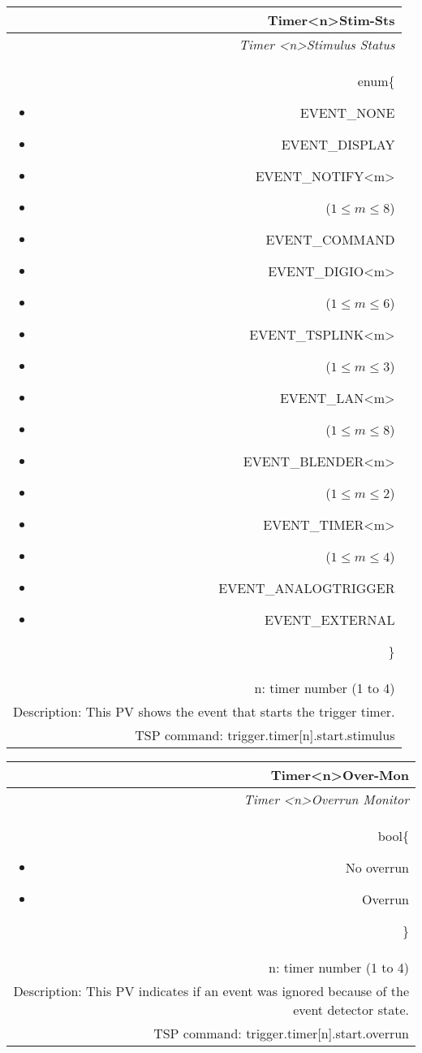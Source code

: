 \documentclass[openany]{article}
\begin{document}
		\begin{tabular}{N}
			\hline
			\bfseries Timer{\textless n\textgreater}Stim-Sts\label{pv:timerstim-sts} \\ \hline
			\emph{Timer \textless n\textgreater Stimulus Status} \\
			enum\{\begin{itemize}[noitemsep]
				\small
				\item[] EVENT\_NONE
				\item[] EVENT\_DISPLAY
				\item[] EVENT\_NOTIFY\textless m\textgreater
				\item[] ($1\leq m\leq 8$)
				\item[] EVENT\_COMMAND
				\item[] EVENT\_DIGIO\textless m\textgreater
				\item[] ($1\leq m\leq 6$)
				\item[] EVENT\_TSPLINK\textless m\textgreater
				\item[] ($1\leq m\leq 3$)
				\item[] EVENT\_LAN\textless m\textgreater
				\item[] ($1\leq m\leq 8$)
				\item[] EVENT\_BLENDER\textless m\textgreater 
				\item[] ($1\leq m\leq 2$)
				\item[] EVENT\_TIMER\textless m\textgreater
				\item[] ($1\leq m\leq 4$)
				\item[] EVENT\_ANALOGTRIGGER
				\item[] EVENT\_EXTERNAL
			\end{itemize}\} \\
			n: timer number (1 to 4) \\
			Description: This PV shows the event that starts the trigger timer. \\
			TSP command: trigger.timer[n].start.stimulus
		\end{tabular}

		\begin{tabular}{N}
			\hline
			\bfseries Timer{\textless n\textgreater}Over-Mon\label{pv:timerover-mon} \\ \hline
			\emph{Timer \textless n\textgreater Overrun Monitor} \\
			bool\{\begin{itemize}[noitemsep]
				\small
				\item[] No overrun
				\item[] Overrun
			\end{itemize}\} \\
			n: timer number (1 to 4) \\
			Description: This PV indicates if an event was ignored because of the event detector state. \\
			TSP command: trigger.timer[n].start.overrun
		\end{tabular}
\end{document}
